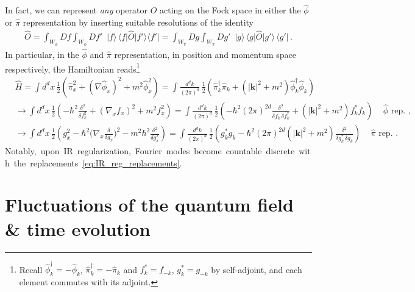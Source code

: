 \documentclass[../QFT_main.tex]{subfiles}
\begin{document}
\begin{mytheorem}
In fact, we can represent \emph{any} operator $\hat{O}$ acting on the Fock space in either the $\hat{\phi}$ or $\hat{\pi}$ representation by inserting suitable resolutions of the identity
\begin{align}\label{eq:phi_represenation_operators}
    \hat{O}= \int_{W_{\phi}}\!\!\! \!\!Df \int_{W_{\phi}}\!\!\!\!\!Df' \,\,\, |f\rangle\, \langle f | \hat{O} | f' \rangle \langle f' |= \int_{W_{\pi}}\!\!\!\!\!Dg \int_{W_{\pi}} \!\!\!\!\!Dg' \,\,\, |g\rangle\, \langle g | \hat{O} | g' \rangle \, \langle g'|\,.
\end{align}
In particular, in the $\hat{\phi}$ and $\hat{\pi}$ representation, in position and momentum space respectively, the Hamiltonian reads\footnote{\label{fn:reality_implies_fk_star+minus_fk} Recall $\hat{\phi}^\dagger_k=-\hat{\phi}_k$, $\hat{\pi}^\dagger_k=-\hat{\pi}_k$ and $f_k^* = f_{-k}$, $g_k^* = g_{-k}$ by self-adjoint, and each element commutes with its adjoint.}
{\small
\begin{align}
    &\hat{H} = \int d^d x\,\tfrac{1}{2}\left( \hat{\pi}^2_x +  (\nabla \hat{\phi}_x)^2 + m^2 \hat{\phi}^2_x\right)
    = \int \frac{d^d k}{(2\pi)^d}\,\tfrac{1}{2}\left(\hat{\pi}_k^\dagger \hat{\pi}_{k} + (|\mathbf{k}|^2 + m^2) \hat{\phi}_k^\dagger \hat{\phi}_{k}\right)
    \\
    &\to \int d^d x\, \tfrac{1}{2} \left( -\hbar^2 \frac{\delta^2}{\delta f_x^2} + (\nabla_x f_x)^2 + m^2 f_x^2 \right)
    = \int\frac{d^d k}{(2\pi)^d}\, \tfrac{1}{2} \left( -\hbar^2 (2\pi)^{2d}\frac{\delta^2}{\delta f_k \,\delta f_k^*} + (|\mathbf{k}|^2 + m^2) f_{k}^* f_k \right)
    \,\,\, \text{ $\hat{\phi}$ rep. }, \\
    &\to \int d^d x\, \tfrac{1}{2} \left( g_x^2 - \hbar^2 \Big(\nabla_x \frac{\delta}{\delta g_x}\Big)^2 - m^2 \hbar^2 \frac{\delta^2}{\delta g_x^2} \right)
    = \int \frac{d^d k}{(2\pi)^d}\,\tfrac{1}{2} \left( g_{k}^* g_{k} - \hbar^2 (2\pi)^{2d} (|\mathbf{k}|^2 + m^2) \frac{\delta^2}{\delta g_{k}^* \,\delta g_k} \right)
    \,\,\,\text{ $\hat{\pi}$ rep. }.
\end{align}
}
\mbox{Notably, upon IR regularization, Fourier modes become countable discrete with the replacements \eqref{eq:IR_reg_replacements}.}
%
\end{mytheorem} 



\section{Fluctuations of the quantum field \& time evolution}
\end{document}
